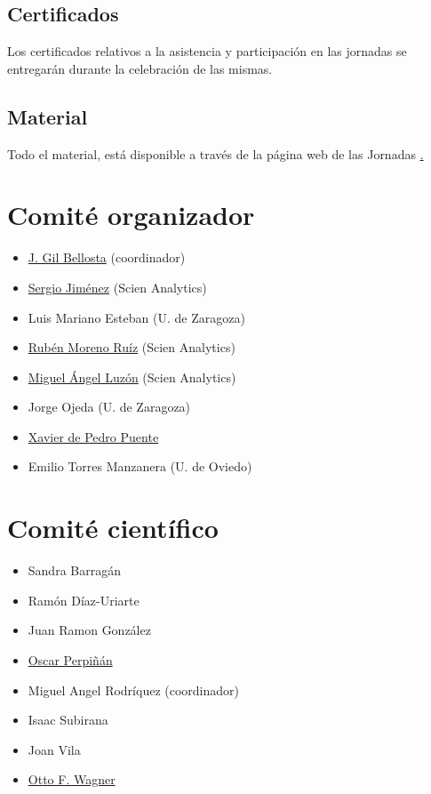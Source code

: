 \section{Certificados}

Los certificados relativos a la asistencia y participación en las jornadas
se entregarán durante la celebración de las mismas.


\section{Material}

Todo el material, está disponible a través de la página web de las Jornadas 
\href{http://r-es.org/V+Jornadas}. 



\chapter{Comité organizador}

\begin{itemize}

\item \href{http://www.datanalytics.com}{J. Gil Bellosta} (coordinador)
\item \href{http://www.scien-analytics.com}{Sergio Jiménez} (Scien Analytics)
\item Luis Mariano Esteban (U. de Zaragoza)
\item \href{http://www.scien-analytics.com}{Rubén Moreno Ruíz} (Scien Analytics)
\item \href{[http://www.scien-analytics.com}{Miguel Ángel Luzón} (Scien Analytics)
\item Jorge Ojeda (U. de Zaragoza)
\item \href{http://ueb.vhir.org|Vall d'Hebron Research Institute}{Xavier de Pedro Puente}
\item  Emilio Torres Manzanera (U. de Oviedo)
\end{itemize}

\chapter{Comité científico}


\begin{itemize}

\item Sandra Barragán
\item Ramón Díaz-Uriarte
\item Juan Ramon González
\item \href{http://oscarperpinan.github.io}{Oscar Perpiñán}
\item Miguel Angel Rodríquez (coordinador)
\item Isaac Subirana
\item Joan Vila
\item \href{http://www.ottofwagner.es}{Otto F. Wagner}

\end{itemize}


